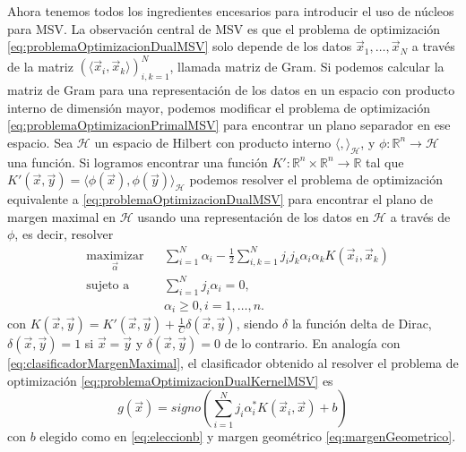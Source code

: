 \documentclass[letterpaper,12pt]{book}
\begin{document}
Ahora tenemos todos los ingredientes encesarios para introducir el uso de núcleos para MSV. La observación central de MSV es que el problema de optimización \ref{eq:problemaOptimizacionDualMSV} solo depende de los datos $\vec{x}_1,\dots,\vec{x}_N$ a través de la matriz $\left( \langle\vec{x}_i, \vec{x}_k\rangle \right)_{i,k=1}^N$, llamada matriz de Gram. Si podemos calcular la matriz de Gram para una representación de los datos en un espacio con producto interno de dimensión mayor, podemos modificar el problema de optimización \ref{eq:problemaOptimizacionPrimalMSV} para encontrar un plano separador en ese espacio. Sea $\mathcal{H}$ un espacio de Hilbert con producto interno $\langle,\rangle_\mathcal{H}$, y $\phi:\mathbb{R}^n\to\mathcal{H}$ una función. Si logramos encontrar una función $K':\mathbb{R}^n\times\mathbb{R}^n\to\mathbb{R}$ tal que $K'(\vec{x},\vec{y}) = \langle\phi(\vec{x}),\phi(\vec{y})\rangle_{\mathcal{H}}$ podemos resolver el problema de optimización equivalente a \ref{eq:problemaOptimizacionDualMSV} para encontrar el plano de margen maximal en $\mathcal{H}$ usando una representación de los datos en $\mathcal{H}$ a través de $\phi$, es decir, resolver
\begin{equation}\label{eq:problemaOptimizacionDualKernelMSV}
  \begin{aligned}
    & \underset{\vec{\alpha}}{\text{maximizar}}
    & & \sum_{i=1}^N \alpha_i -\frac{1}{2}\sum_{i,k=1}^Nj_ij_k\alpha_i\alpha_k K\left(\vec{x}_i, \vec{x}_k\right)\\
    & \text{sujeto a}
    & & \sum_{i=1}^Nj_i\alpha_i = 0, \\
    & & & \alpha_i \geq 0 , i = 1,\dots,n. 
  \end{aligned}
\end{equation}
con $K(\vec{x},\vec{y}) = K'(\vec{x},\vec{y}) + \frac{1}{C}\delta(\vec{x},\vec{y})$, siendo $\delta$ la función delta de Dirac, $\delta(\vec{x},\vec{y}) = 1$ si $\vec{x}=\vec{y}$ y $\delta(\vec{x},\vec{y})= 0$ de lo contrario. En analogía con \ref{eq:clasificadorMargenMaximal}, el clasificador obtenido al resolver el problema de optimización \ref{eq:problemaOptimizacionDualKernelMSV} es 
\begin{equation}\label{eq:clasificadorMargenMaximalKernel}
g(\vec{x}) = signo\left(\sum_{i=1}^{N}j_i\alpha_i^*K\left(\vec{x}_i,\vec{x}\right) + b \right)
\end{equation}
con $b$ elegido como en \ref{eq:eleccionb} y margen geométrico \ref{eq:margenGeometrico}.
\end{document}
